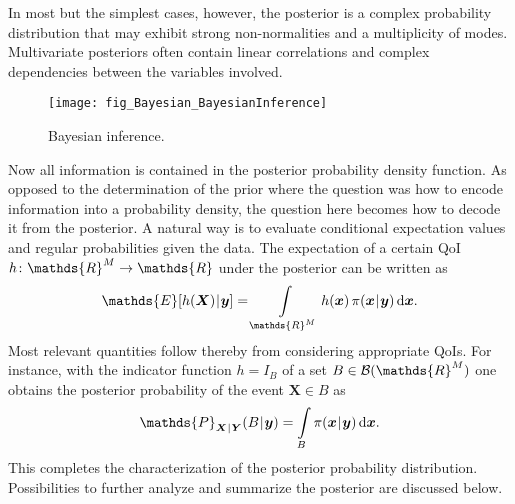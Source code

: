 In most but the simplest cases, however, the posterior is a complex probability distribution that may exhibit strong non-normalities and a multiplicity of modes.
Multivariate posteriors often contain linear correlations and complex dependencies between the variables involved.
\begin{figure}[htbp]
  \centering
  \texttt{[image: fig\_Bayesian\_BayesianInference]}
  \caption[Bayesian inference]{Bayesian inference.}
  \label{fig:Bayesian:BayesianInference}
\end{figure}
\par %
Now all information is contained in the posterior probability density function.
As opposed to the determination of the prior where the question was how to encode information into a probability density, the question here becomes how to decode it from the posterior.
A natural way is to evaluate conditional expectation values and regular probabilities given the data.
The expectation of a certain QoI \(h \colon \mathds{R}^\dimParam \rightarrow \mathds{R}\) under the posterior can be written as
\begin{equation} \label{eq:Bayesian:ConditionalExpectation}
  \mathds{E}[h(\bm{X}) \cond \bm{y}] = \int\limits_{\mathds{R}^\dimParam} h(\bm{x}) \, \pi(\bm{x} \cond \bm{y}) \, \mathrm{d} \bm{x}.
\end{equation}
Most relevant quantities follow thereby from considering appropriate QoIs.
For instance, with the indicator function \(h = I_B\) of a set \(B \in \mathcal{B}(\mathds{R}^\dimParam)\) one obtains the posterior probability of the event \(\bm{X} \in B\) as
\begin{equation} \label{eq:Bayesian:ConditionalProbability}
  \mathds{P}_{\bm{X} \cond \bm{Y}}(B \cond \bm{y}) = \int\limits_{B} \pi(\bm{x} \cond \bm{y}) \, \mathrm{d} \bm{x}.
\end{equation}
This completes the characterization of the posterior probability distribution.
Possibilities to further analyze and summarize the posterior are discussed below.

